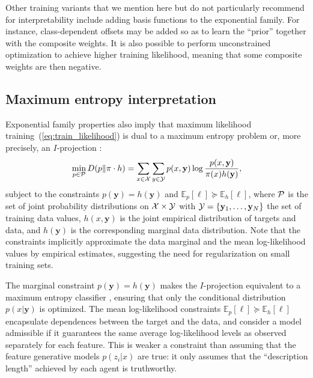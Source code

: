 \documentclass[english]{scrartcl}
\def\y{{\mathbf{y}}}
\newcommand{\bell}{{\boldsymbol{\ell}}}
\newcommand{\E}{\mathbb{E}}
\begin{document}
Other training variants that we mention here but do not particularly recommend for interpretability include adding basis functions to the exponential family. For instance, class-dependent offsets may be added so as to learn the ``prior'' together with the composite weights. It is also possible to perform unconstrained optimization to achieve higher training likelihood, meaning that some composite weights are then negative.


\subsection{Maximum entropy interpretation}

Exponential family properties also imply that maximum likelihood training~(\ref{eq:train_likelihood}) is dual to a maximum entropy problem or, more precisely, an $I$-projection \cite{Csiszar-84}:
\begin{equation}
\label{eq:maxent}
\min_{p\in{\cal P}} D(p\|\pi \cdot h) = \sum_{x\in{\cal X}}\sum_{y\in{\cal Y}} p(x,\y) \log \frac{p(x,\y)}{\pi(x)h(\y)},
\end{equation}
subject to the constraints $p(\y)=h(\y)$ and $\E_p[\bell] \succeq \E_h[\bell]$, where 
${\cal P}$ is the set of joint probability distributions on ${\cal X}\times {\cal Y}$
with ${\cal Y}=\{\y_1,\ldots,\y_N\}$ the set of training data values, $h(x,\y)$ is the joint empirical distribution of targets and data, and $h(\y)$ is the corresponding marginal data distribution. Note that the constraints implicitly approximate the data marginal and the mean log-likelihood values by empirical estimates, suggesting the need for regularization on small training sets.

The marginal constraint $p(\y)=h(\y)$ makes the $I$-projection equivalent to a maximum entropy classifier \cite{BergerA-96}, ensuring that only the conditional distribution $p(x|\y)$ is optimized. The mean log-likelihood constraints $\E_p[\bell] \succeq \E_h[\bell]$ encapsulate dependences between the target and the data, and consider a model admissible if it guarantees the same average log-likelihood levels as observed separately for each feature. This is weaker a constraint than assuming that the feature generative models $p(z_i|x)$ are true: it only assumes that the ``description length'' \cite{Grunwald-07} achieved by each agent is truthworthy.

\end{document}
